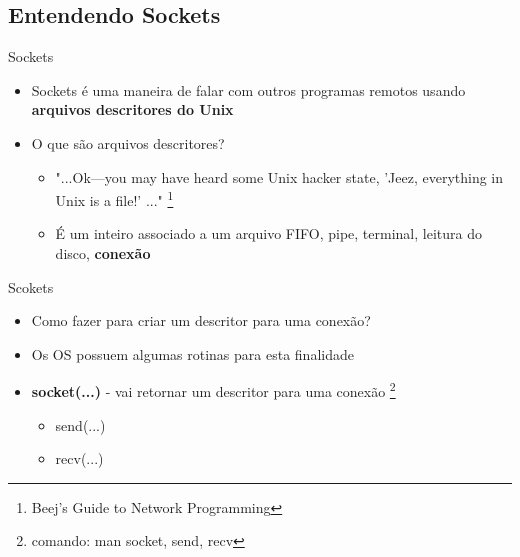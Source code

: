 \documentclass[10pt, xcolor=x11names]{beamer}
\begin{document}
\subsection{Entendendo Sockets} %


\begin{frame} %
	\begin{block}{Sockets}
		\begin{itemize}
			\item<1-> Sockets é uma maneira de falar com outros programas remotos usando \textbf<2->{arquivos descritores do Unix}
			\item<2-> O que são arquivos descritores?
				\begin{itemize}
					\item "...Ok—you may have heard some Unix hacker state, 'Jeez, everything in Unix is a file!' ..." \footnote{Beej's Guide to Network Programming}
					\item É um inteiro associado a um arquivo {FIFO, pipe, terminal, leitura do disco, \textbf{conexão}}
				\end{itemize}
		\end{itemize}
	\end{block}
\end{frame}

\begin{frame}
	\begin{block}{Scokets}
		\begin{itemize}
			\item<1-> Como fazer para criar um descritor para uma conexão?
			\item<2-> Os OS possuem algumas rotinas para esta finalidade
			\item<3-> \textbf{socket(...)} - vai retornar um descritor para uma conexão \footnote{comando: man socket, send, recv}
			\begin{itemize}
				\item send(...)
				\item recv(...)
			\end{itemize}
		\end{itemize}
	\end{block}
\end{frame}


\end{document}
